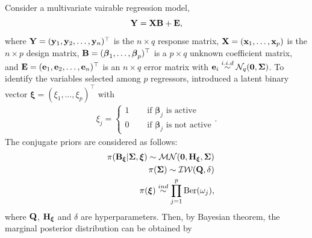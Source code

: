 \documentclass[]{book}
\begin{document}
Consider a multivariate vairable regression model,
\[{\bf Y}= {\bf X}{\bf B}+ {\bf E},\]
where \({\bf Y}=({\bf y}_1,{\bf y}_2,\ldots,{\bf y}_n)^{{\top}}\) is the \(n \times q\) response matrix, \({\bf X}= ({\bf x}_1,\ldots,{\bf x}_p)\) is the \(n\times p\) design matrix, \({\bf B}= ({\boldsymbol \beta}_1,\ldots,{\boldsymbol \beta}_p)^{{\top}}\) is a \(p\times q\) unknown coefficient matrix, and \({\bf E}= ({\bf e}_1,{\bf e}_2,\ldots,{\bf e}_n)^{{\top}}\) is an \(n\times q\) error matrix with \({\bf e}_i \overset{i.i.d}{\sim}\mathcal{N}_q({\bf 0}, {\boldsymbol \Sigma})\). To identify the variables selected among \(p\) regressors, \citep{Brown} introduced a latent binary vector \({\boldsymbol \xi}= (\xi_1,\ldots, \xi_p)^{{\top}}\) with
\begin{eqnarray*}
\xi_j=\begin{cases} 1 \quad &  \text{ if ${\boldsymbol \beta}_j$ is active} \\0 \quad & \text{ if ${\boldsymbol \beta}_j$ is not active}
\end{cases}.
\end{eqnarray*}
The conjugate priors are considered as follows:
\begin{eqnarray*}
&& \pi({\bf B}_{{\boldsymbol \xi}}|{\boldsymbol \Sigma},{\boldsymbol \xi}) \sim \mathcal{MN}({\bf 0},{\bf H}_{{\boldsymbol \xi}}, {\boldsymbol \Sigma})\\
&& \pi({\boldsymbol \Sigma}) \sim \mathcal{IW}({\bf Q},\delta)\\
&& \pi({\boldsymbol \xi}) \overset{ind}{\sim} \prod_{j=1}^{p} \text{Ber}(\omega_j),
\end{eqnarray*}
where \({\bf Q}\), \({\bf H}_{{\boldsymbol \xi}}\) and \(\delta\) are hyperparameters.
Then, by Bayesian theorem, the marginal posterior distribution can be obtained by
\end{document}
